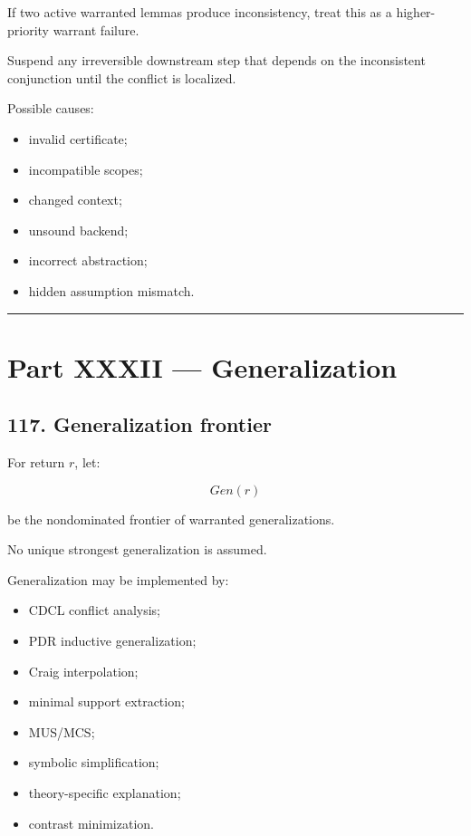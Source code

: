 \documentclass[
]{article}
\providecommand{\tightlist}{%
  \setlength{\itemsep}{0pt}\setlength{\parskip}{0pt}}
\begin{document}
If two active warranted lemmas produce inconsistency, treat this as a
higher-priority warrant failure.

Suspend any irreversible downstream step that depends on the
inconsistent conjunction until the conflict is localized.

Possible causes:

\begin{itemize}
\tightlist
\item
  invalid certificate;
\item
  incompatible scopes;
\item
  changed context;
\item
  unsound backend;
\item
  incorrect abstraction;
\item
  hidden assumption mismatch.
\end{itemize}

\begin{center}\rule{0.5\linewidth}{0.5pt}\end{center}

\section{Part XXXII --- Generalization}\label{part-xxxii-generalization}

\subsection{117. Generalization frontier}\label{generalization-frontier}

For return \(r\), let:

\[
\boxed{
Gen(r)
}
\]

be the nondominated frontier of warranted generalizations.

No unique strongest generalization is assumed.

Generalization may be implemented by:

\begin{itemize}
\tightlist
\item
  CDCL conflict analysis;
\item
  PDR inductive generalization;
\item
  Craig interpolation;
\item
  minimal support extraction;
\item
  MUS/MCS;
\item
  symbolic simplification;
\item
  theory-specific explanation;
\item
  contrast minimization.
\end{itemize}
\end{document}
